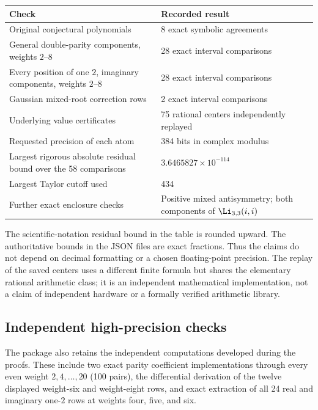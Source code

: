 \begin{center}
\small
\begin{tabular}{@{}P{0.51\textwidth}P{0.40\textwidth}@{}}
\toprule
Check & Recorded result\\
\midrule
Original conjectural polynomials & 8 exact symbolic agreements\\[3pt]
General double-parity components, weights $2$--$8$ & 28 exact interval comparisons\\[3pt]
Every position of one $2$, imaginary components, weights $2$--$8$
& 28 exact interval comparisons\\[3pt]
Gaussian mixed-root correction rows & 2 exact interval comparisons\\[3pt]
Underlying value certificates & 75 rational centers independently replayed\\[3pt]
Requested precision of each atom & 384 bits in complex modulus\\[3pt]
Largest rigorous absolute residual bound over the 58 comparisons
& $3.6465827\times10^{-114}$\\[3pt]
Largest Taylor cutoff used & 434\\[3pt]
Further exact enclosure checks & Positive mixed antisymmetry; both
components of $\Li_{3,3}(i,i)$\\
\bottomrule
\end{tabular}
\end{center}

The scientific-notation residual bound in the table is rounded upward.
The authoritative bounds in the JSON files are exact fractions.
Thus the claims do not depend on decimal formatting or a chosen
floating-point precision. The replay of the saved centers uses a
different finite formula but shares the elementary rational arithmetic
class; it is an independent mathematical implementation, not a claim
of independent hardware or a formally verified arithmetic library.

\subsection{Independent high-precision checks}

The package also retains the independent computations developed during
the proofs. These include two exact parity coefficient implementations
through every even weight $2,4,\ldots,20$ (100 pairs), the differential
derivation of the twelve displayed weight-six and weight-eight rows,
and exact extraction of all 24 real and imaginary one-$2$ rows at
weights four, five, and six.

